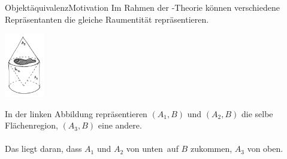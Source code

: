 \documentclass[10pt,xcolor={dvipsnames}]{beamer}
\begin{document}

\begin{frame}{Objektäquivalenz}{Motivation}
    Im Rahmen der \bso-Theorie können verschiedene Repräsentanten die gleiche Raumentität repräsentieren.\\
    \vspace{1cm}
    \parbox{0.2\textwidth}{\includegraphics[height=2.8cm]{img/objektaeq-flaechen_transparent.png}}
    \parbox{0.75\textwidth}{
        In der linken Abbildung repräsentieren $(A_1,B)$ und $(A_2,B)$ die selbe Flächenregion, $(A_3,B)$ eine andere.\\ \ \\
        Das liegt daran, dass $A_1$ und $A_2$ \glqq von unten\grqq\ auf $B$ zukommen, $A_3$ \glqq von oben\grqq.
    }
\end{frame}




\end{document}
